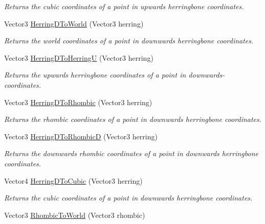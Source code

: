 \begin{DoxyCompactItemize}
\begin{DoxyCompactList}\small\item\em Returns the cubic coordinates of a point in upwards herringbone coordinates.\end{DoxyCompactList}\item 
Vector3 \hyperlink{class_g_f_hex_grid_a23e68e317c4004a146e2cbafb6bc56c0_a23e68e317c4004a146e2cbafb6bc56c0}{Herring\+D\+To\+World} (Vector3 herring)
\begin{DoxyCompactList}\small\item\em Returns the world coordinates of a point in downwards herringbone coordinates.\end{DoxyCompactList}\item 
Vector3 \hyperlink{class_g_f_hex_grid_ab68b4ecc340f6014bba1ac6851921c34_ab68b4ecc340f6014bba1ac6851921c34}{Herring\+D\+To\+Herring\+U} (Vector3 herring)
\begin{DoxyCompactList}\small\item\em Returns the upwards herringbone coordinates of a point in downwards-\/ coordinates.\end{DoxyCompactList}\item 
Vector3 \hyperlink{class_g_f_hex_grid_a9113159acea48cf847a3e8e50828bbf7_a9113159acea48cf847a3e8e50828bbf7}{Herring\+D\+To\+Rhombic} (Vector3 herring)
\begin{DoxyCompactList}\small\item\em Returns the rhombic coordinates of a point in downwards herringbone coordinates.\end{DoxyCompactList}\item 
Vector3 \hyperlink{class_g_f_hex_grid_a8ee594b22885339e63dfcefc9efe90b5_a8ee594b22885339e63dfcefc9efe90b5}{Herring\+D\+To\+Rhombic\+D} (Vector3 herring)
\begin{DoxyCompactList}\small\item\em Returns the downwards rhombic coordinates of a point in downwards herringbone coordinates.\end{DoxyCompactList}\item 
Vector4 \hyperlink{class_g_f_hex_grid_a0105d03d663f6e3086d0a6a0cde650f5_a0105d03d663f6e3086d0a6a0cde650f5}{Herring\+D\+To\+Cubic} (Vector3 herring)
\begin{DoxyCompactList}\small\item\em Returns the cubic coordinates of a point in downwards herringbone coordinates.\end{DoxyCompactList}\item 
Vector3 \hyperlink{class_g_f_hex_grid_af8215888f6f22eccc2da17f0984fb5c1_af8215888f6f22eccc2da17f0984fb5c1}{Rhombic\+To\+World} (Vector3 rhombic)

\end{DoxyCompactItemize}
